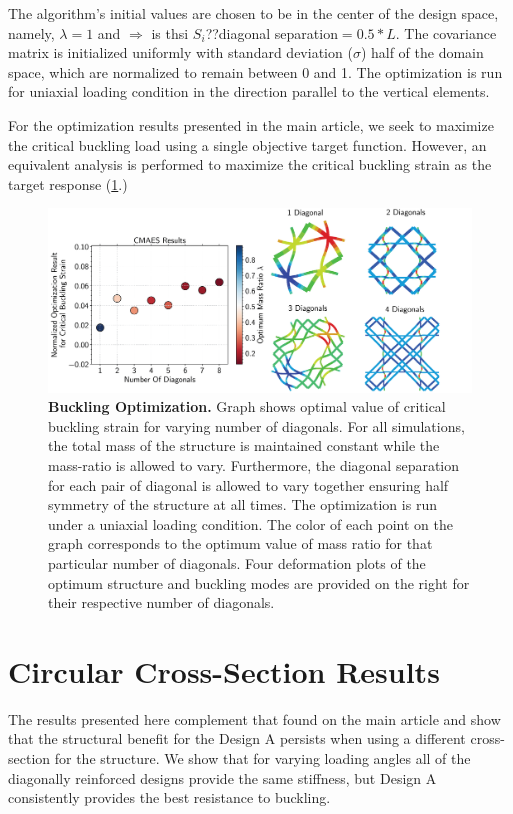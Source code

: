 \documentclass[10pt,twoside]{fernandes_supp}
\newcommand{\KB}[1]{\noindent\color{blue}$\Longrightarrow$ #1\normalcolor}
\begin{document}
The algorithm's initial values are chosen to be in the center of the design space, namely, $\lambda=1$ and \KB{is thsi $S_i$??}diagonal separation$=0.5*L$. The covariance matrix is initialized uniformly with standard deviation ($\sigma$) half of the domain space, which are normalized to remain between 0 and 1. The optimization is run for uniaxial loading condition in the direction parallel to the vertical elements. 

For the optimization results presented in the main article, we seek to maximize the critical buckling load using a single objective target function. However, an equivalent analysis is performed to maximize the critical buckling strain as the target response (\cref{BucklingOptimization}.) 



\begin{figure}
    \centering
    \includegraphics[width=0.9\linewidth]{SFig6.png}
    \caption{{\bf Buckling Optimization.} Graph shows optimal value of critical buckling strain for varying number of diagonals. For all simulations, the total mass of the structure is maintained constant while the mass-ratio is allowed to vary. Furthermore, the diagonal separation for each pair of diagonal is allowed to vary together ensuring half symmetry of the structure at all times. The optimization is run under a uniaxial loading condition. The color of each point on the graph corresponds to the optimum value of mass ratio for that particular number of diagonals. Four deformation plots of the optimum structure and buckling modes are provided on the right for their respective number of diagonals.}
    \label{BucklingOptimization}
\end{figure}

\section{Circular Cross-Section Results}
The results presented here complement that found on the main article and show that the structural benefit for the Design A persists when using a different cross-section for the structure. We show that for varying loading angles all of the diagonally reinforced designs provide the same stiffness, but Design A consistently provides the best resistance to buckling. 
\end{document}
